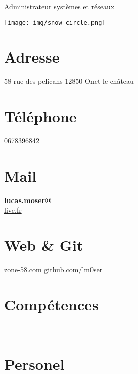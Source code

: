 \documentclass[]{friggeri-cv}
\begin{document}
      {Administrateur systèmes et réseaux}
      

\begin{aside}
  \texttt{[image: img/snow\_circle.png]}
  \section{Adresse}
    58 rue des pelicans
    12850 Onet-le-château
    ~
  \section{Téléphone}
    0678396842
    ~
  \section{Mail}
    \href{mailto:lucas.moser@live.fr}{\textbf{lucas.moser@}\\live.fr}
    ~
  \section{Web \& Git}
    \href{http://www.zone-58.com}{zone-58.com}
    \href{https://github.com/lm0ser}{github.com/lm0ser}
    ~
  \section{Compétences}
    ~
  \section{Personel}
    ~
\end{aside}
~
\end{document}
